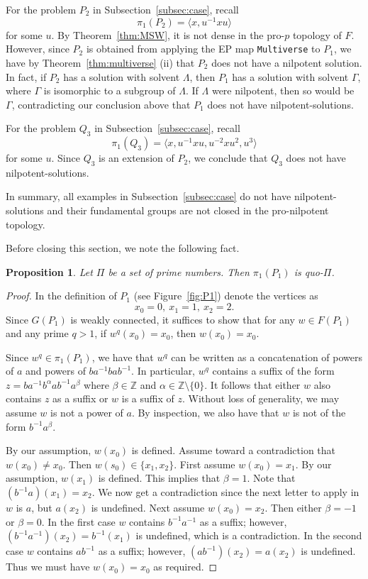 \documentclass[11pt]{amsart}
\newtheorem{proposition}[theorem]{Proposition}
\theoremstyle{definition}
\theoremstyle{definition}
\numberwithin{equation}{section}
\begin{document}
For the problem $P_2$ in Subsection~\ref{subsec:case}, recall 
$$ \pi_1(P_2)=\langle x, u^{-1}xu\rangle $$
for some $u$. By Theorem~\ref{thm:MSW}, it is not dense in the pro-$p$ topology of $F$. However, since $P_2$ is obtained from applying the EP map {\tt Multiverse} to $P_1$, we have by Theorem~\ref{thm:multiverse} (ii) that $P_2$ does not have a nilpotent solution. In fact, if $P_2$ has a solution with solvent $\Lambda$, then $P_1$ has a solution with solvent $\Gamma$, where $\Gamma$ is isomorphic to a subgroup of $\Lambda$. If $\Lambda$ were nilpotent, then so would be $\Gamma$, contradicting our conclusion above that $P_1$ does not have nilpotent-solutions. 

For the problem $Q_3$ in Subsection~\ref{subsec:case}, recall
$$ \pi_1(Q_3)=\langle x, u^{-1}xu, u^{-2}xu^2, u^3\rangle $$
for some $u$. Since $Q_3$ is an extension of $P_2$,  we conclude that $Q_3$ does not have nilpotent-solutions.

In summary, all examples in Subsection~\ref{subsec:case} do not have nilpotent-solutions and their fundamental groups are not closed in the pro-nilpotent topology.


Before closing this section, we note the following fact.

\begin{proposition} Let $\Pi$ be a set of prime numbers. Then $\pi_1(P_1)$ is quo-$\Pi$.
\end{proposition}

\begin{proof} In the definition of $P_1$ (see Figure~\ref{fig:P1}) denote the vertices as 
$$x_0=0,\ x_1=1, \ x_2=2. $$ 
Since $G(P_1)$ is weakly connected, it suffices to show that for any $w\in F(P_1)$ and any prime $q>1$, if $w^q(x_0)=x_0$, then $w(x_0)=x_0$. 

Since $w^q\in \pi_1(P_1)$, we have that $w^q$ can be written as a concatenation of powers of $a$ and powers of $ba^{-1}bab^{-1}$. In particular, $w^q$ contains a suffix of the form $z=ba^{-1}b^{\alpha}ab^{-1}a^{\beta}$ where $\beta\in \mathbb{Z}$ and $\alpha\in \mathbb{Z}\setminus\{0\}$. It follows that either $w$ also contains $z$ as a suffix or $w$ is a suffix of $z$. Without loss of generality, we may assume $w$ is not a power of $a$. By inspection, we also have that $w$ is not of the form $b^{-1}a^{\beta}$.

By our assumption, $w(x_0)$ is defined. Assume toward a contradiction that $w(x_0)\neq x_0$. Then $w(s_0)\in \{x_1, x_2\}$. First assume $w(x_0)=x_1$. By our assumption, $w(x_1)$ is defined. This implies that $\beta=1$. Note that $(b^{-1}a)(x_1)=x_2$. We now get a contradiction since the next letter to apply in $w$ is $a$, but $a(x_2)$ is undefined. Next assume $w(x_0)=x_2$. Then either $\beta=-1$ or $\beta=0$. In the first case $w$ contains $b^{-1}a^{-1}$ as a suffix; however, $(b^{-1}a^{-1})(x_2)=b^{-1}(x_1)$ is undefined, which is a contradiction. In the second case $w$ contains $ab^{-1}$ as a suffix; however, $(ab^{-1})(x_2)=a(x_2)$ is undefined. Thus we must have $w(x_0)=x_0$ as required.
\end{proof}
\end{document}
